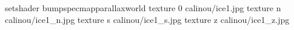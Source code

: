 setshader bumpspecmapparallaxworld
texture 0 calinou/ice1.jpg
texture n calinou/ice1_n.jpg
texture s calinou/ice1_s.jpg
texture z calinou/ice1_z.jpg
